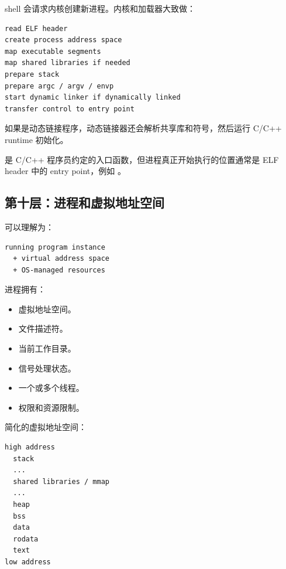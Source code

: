 shell 会请求内核创建新进程。内核和加载器大致做：

\begin{center}
\begin{minipage}{0.82\linewidth}
\begin{verbatim}
read ELF header
create process address space
map executable segments
map shared libraries if needed
prepare stack
prepare argc / argv / envp
start dynamic linker if dynamically linked
transfer control to entry point
\end{verbatim}
\end{minipage}
\end{center}

如果是动态链接程序，动态链接器还会解析共享库和符号，然后运行 C/C++ runtime 初始化。

\begin{keyidea}
 是 C/C++ 程序员约定的入口函数，但进程真正开始执行的位置通常是 ELF header 中的 entry point，例如 。
\end{keyidea}

\subsection{第十层：进程和虚拟地址空间}

 可以理解为：

\begin{center}
\begin{minipage}{0.75\linewidth}
\begin{verbatim}
running program instance
  + virtual address space
  + OS-managed resources
\end{verbatim}
\end{minipage}
\end{center}

进程拥有：

\begin{itemize}
  \item 虚拟地址空间。
  \item 文件描述符。
  \item 当前工作目录。
  \item 信号处理状态。
  \item 一个或多个线程。
  \item 权限和资源限制。
\end{itemize}

简化的虚拟地址空间：

\begin{center}
\begin{minipage}{0.5\linewidth}
\begin{verbatim}
high address
  stack
  ...
  shared libraries / mmap
  ...
  heap
  bss
  data
  rodata
  text
low address
\end{verbatim}
\end{minipage}
\end{center}

